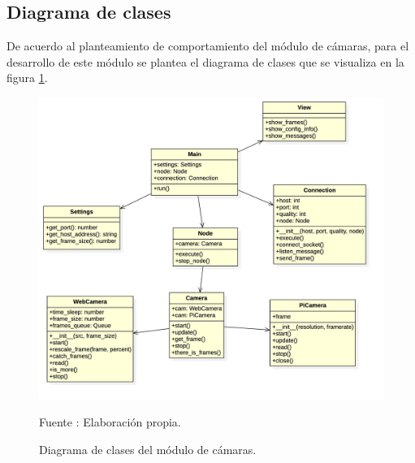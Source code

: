 \subsection{Diagrama de clases}
De acuerdo al planteamiento de comportamiento del módulo de cámaras, para el desarrollo de este módulo se plantea el diagrama de clases que se visualiza en la figura \ref{fig:camera_clases}.\\

\begin{figure}[H]
    \begin{center}
        \includegraphics[width=15cm]{img/capitulo_4/camera_clases.jpg}
        \caption{Diagrama de clases del módulo de cámaras.}
        Fuente : Elaboración propia.
        \label{fig:camera_clases}
    \end{center}
\end{figure}

